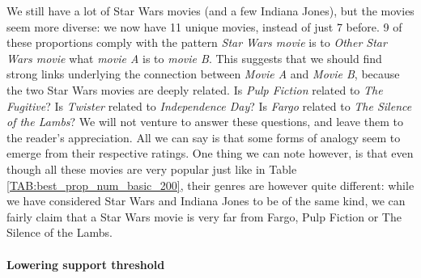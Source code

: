 We still have a lot of Star Wars movies (and a few Indiana Jones), but the
movies seem more diverse: we now have 11 unique movies, instead of just 7
before. 9 of these proportions comply with the pattern \textit{Star Wars
movie} is to \textit{Other Star Wars movie} what \textit{movie A} is to
\textit{movie B}. This suggests that we should find strong links underlying the
connection between \textit{Movie A} and \textit{Movie B}, because the two Star
Wars movies are deeply related. Is \textit{Pulp Fiction} related to \textit{The
Fugitive}? Is \textit{Twister} related to \textit{Independence Day}? Is
\textit{Fargo} related to \textit{The Silence of the Lambs}? We will not
venture to answer these questions, and leave them to the reader's appreciation.
All we can say is that some forms of analogy seem to emerge from their
respective ratings.  One thing we can note however, is that even though all
these movies are very popular just like in Table
\ref{TAB:best_prop_num_basic_200}, their genres are however quite different:
while we have considered Star Wars and Indiana Jones to be of the same kind, we
can fairly claim that a Star Wars movie is very far from Fargo, Pulp Fiction or
The Silence of the Lambs.

\paragraph{Lowering support threshold\\}

